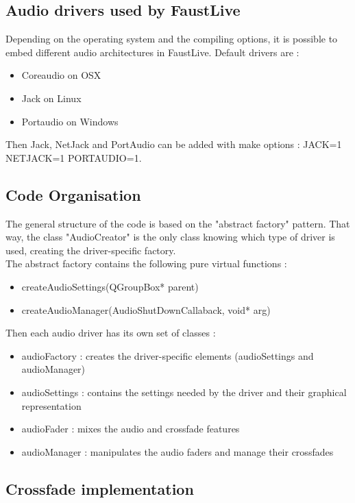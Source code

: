 \documentclass[a4paper]{article}
\begin{document}
{\subsection{Audio drivers used by FaustLive}
 
Depending on the operating system and the compiling options, it is possible to embed different audio architectures in FaustLive.
Default drivers are :
\begin{itemize}
\item Coreaudio on OSX
\item Jack on Linux
\item Portaudio on Windows
\end{itemize}

Then Jack, NetJack and PortAudio can be added with make options : JACK=1 NETJACK=1 PORTAUDIO=1.

\subsection{Code Organisation}

The general structure of the code is based on the "abstract factory" pattern. That way, the class "AudioCreator" is the only class knowing which type of driver is used, creating the driver-specific factory.  \\

The abstract factory contains the following pure virtual functions :
\begin{itemize}
\item createAudioSettings(QGroupBox* parent)
\item createAudioManager(AudioShutDownCallaback, void* arg)
\end{itemize}

Then each audio driver has its own set of classes :
\begin{itemize}
\item audioFactory : creates the driver-specific elements (audioSettings and audioManager)
\item audioSettings : contains the settings needed by the driver and their graphical representation
\item audioFader : mixes the audio and crossfade features
\item audioManager : manipulates the audio faders and manage their crossfades 
\end{itemize}

\subsection{Crossfade implementation}

}
\end{document}
